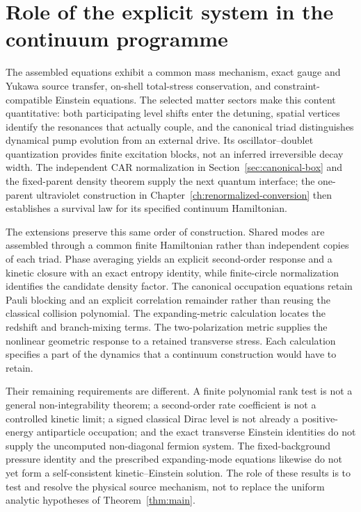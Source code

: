 \documentclass[11pt,a4paper,oneside]{book}
\theoremstyle{plain}
\theoremstyle{definition}
\theoremstyle{remark}
\begin{document}
\section{Role of the explicit system in the continuum programme}
The assembled equations exhibit a common mass mechanism, exact gauge and
Yukawa source transfer, on-shell total-stress conservation, and
constraint-compatible Einstein equations.  The selected matter sectors
make this content quantitative: both participating level shifts enter
the detuning, spatial vertices identify the resonances that actually
couple, and the canonical triad distinguishes dynamical pump evolution
from an external drive.  Its oscillator--doublet quantization provides
finite excitation blocks, not an inferred irreversible decay width.
The independent CAR normalization in Section~\ref{sec:canonical-box}
and the fixed-parent density theorem supply the next quantum interface;
the one-parent ultraviolet construction in
Chapter~\ref{ch:renormalized-conversion} then establishes a survival
law for its specified continuum Hamiltonian.

The extensions preserve this same order of construction.  Shared modes
are assembled through a common finite Hamiltonian rather than independent
copies of each triad.  Phase averaging yields an explicit second-order
response and a kinetic closure with an exact entropy identity, while
finite-circle normalization identifies the candidate density factor.
The canonical occupation equations retain Pauli blocking and an explicit
correlation remainder rather than reusing the classical collision
polynomial.  The expanding-metric calculation locates the redshift and branch-mixing
terms.  The two-polarization metric supplies the nonlinear geometric
response to a retained transverse stress.  Each calculation specifies a
part of the dynamics that a continuum construction would have to retain.

Their remaining requirements are different.  A finite polynomial rank
test is not a general non-integrability theorem; a second-order rate
coefficient is not a controlled kinetic limit; a signed classical Dirac
level is not already a positive-energy antiparticle occupation; and the
exact transverse Einstein identities do not supply the uncomputed
non-diagonal fermion system.  The fixed-background pressure identity and
the prescribed expanding-mode equations likewise do not yet form a
self-consistent kinetic--Einstein solution.  The role of these results is
to test and resolve the physical source mechanism, not to replace the
uniform analytic hypotheses of Theorem~\ref{thm:main}.
\end{document}
